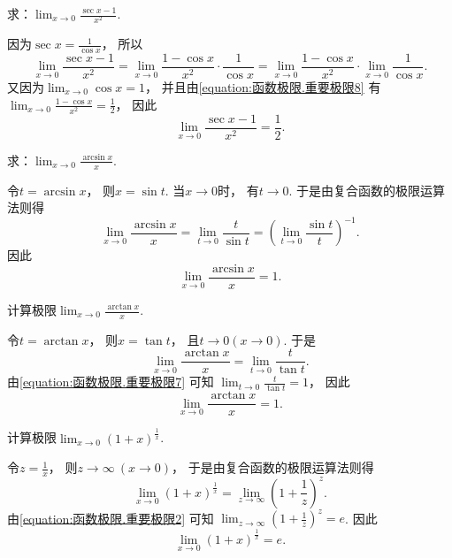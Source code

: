 \begin{example}
求：\(\lim_{x\to0} \frac{\sec x-1}{x^2}\).
\begin{solution}
因为\(\sec x = \frac1{\cos x}\)，
所以\[
	\lim_{x\to0} \frac{\sec x-1}{x^2}
	= \lim_{x\to0} \frac{1-\cos x}{x^2} \cdot \frac1{\cos x}
	= \lim_{x\to0} \frac{1-\cos x}{x^2} \cdot \lim_{x\to0} \frac1{\cos x}.
\]
又因为\(\lim_{x\to0} \cos x = 1\)，
并且由\cref{equation:函数极限.重要极限8} 有
\(\lim_{x\to0} \frac{1-\cos x}{x^2} = \frac12\)，
因此\begin{equation}\label{equation:函数极限.重要极限15}
	\lim_{x\to0} \frac{\sec x-1}{x^2} = \frac12.
\end{equation}
\end{solution}
\end{example}

\begin{example}
求：\(\lim_{x\to0} \frac{\arcsin x}{x}\).
\begin{solution}
令\(t = \arcsin x\)，
则\(x = \sin t\).
当\(x\to0\)时，
有\(t\to0\).
于是由复合函数的极限运算法则得\[
	\lim_{x\to0} \frac{\arcsin x}{x}
	= \lim_{t\to0} \frac{t}{\sin t}
	= \left(\lim_{t\to0} \frac{\sin t}{t}\right)^{-1}.
\]
因此\begin{equation}\label{equation:函数极限.重要极限9}
	\lim_{x\to0} \frac{\arcsin x}{x} = 1.
\end{equation}
\end{solution}
\end{example}

\begin{example}
计算极限\(\lim_{x\to0} \frac{\arctan x}{x}\).
\begin{solution}
令\(t = \arctan x\)，
则\(x = \tan t\)，
且\(t\to0(x\to0)\).
于是\[
	\lim_{x\to0} \frac{\arctan x}{x}
	= \lim_{t\to0} \frac{t}{\tan t}.
\]
由\cref{equation:函数极限.重要极限7} 可知
\(\lim_{t\to0} \frac{t}{\tan t} = 1\)，
因此\begin{equation}\label{equation:函数极限.重要极限10}
	\lim_{x\to0} \frac{\arctan x}{x} = 1.
\end{equation}
\end{solution}
\end{example}

\begin{example}
计算极限\(\lim_{x\to0} (1+x)^{\frac1x}\).
\begin{solution}
令\(z = \frac1x\)，
则\(z\to\infty\ (x\to0)\)，
于是由复合函数的极限运算法则得\[
	\lim_{x\to0} (1+x)^{\frac1x}
	= \lim_{z\to\infty} \left(1+\frac1z\right)^z.
\]
由\cref{equation:函数极限.重要极限2} 可知
\(\lim_{z\to\infty} \left(1+\frac1z\right)^z = e\).
因此\begin{equation}\label{equation:函数极限.重要极限11}
	\lim_{x\to0} (1+x)^{\frac1x} = e.
\end{equation}
\end{solution}
\end{example}

